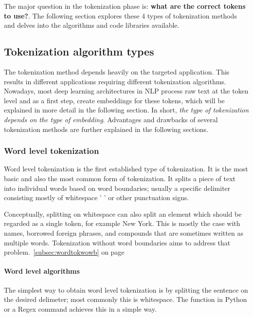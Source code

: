 The major question in the tokenization phase is: \textbf{what are the correct tokens to use?}. The following section explores these 4 types of tokenization methods and delves into the algorithms and code libraries available.

\subsection{Tokenization algorithm types}

The tokenization method depends heavily on the targeted application. This results in different applications requiring different tokenization algorithms. Nowadays, most deep learning architectures in NLP process raw text at the token level and as a first step, create embeddings for these tokens, which will be explained in more detail in the following section. In short, \textit{the type of tokenization depends on the type of embedding}. Advantages and drawbacks of several tokenization methods are further explained in the following sections.

\subsubsection{Word level tokenization}

Word level tokenization is the first established type of tokenization. It is the most basic and also the most common form of tokenization. It splits a piece of text into individual words based on word boundaries; usually a specific delimiter consisting mostly of whitespace ' ' or other punctuation signs.

Conceptually, splitting on whitespace can also split an element which should be regarded as a single token, for example New York. This is mostly the case with names, borrowed foreign phrases, and compounds that are sometimes written as multiple words. Tokenization without word boundaries aims to address that problem.~\ref{subsec:wordtokwowb} on page~\pageref{subsec:wordtokwowb}

\paragraph{Word level algorithms}

The simplest way to obtain word level tokenization is by splitting the sentence on the desired delimeter; most commonly this is whitespace. The  function in Python or a Regex command  achieves this in a simple way.

